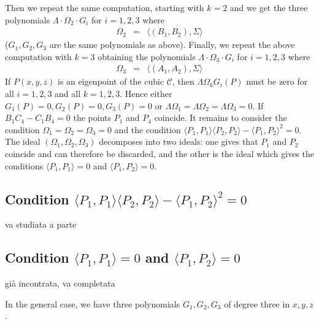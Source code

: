 \documentclass{amsart}
\theoremstyle{plain}
\theoremstyle{definition}
\newcommand{\scl}[2]{\langle #1, #2 \rangle}
\begin{document}
Then we repeat the same computation, starting with $k=2$ and 
we get the three polynomials
$\Lambda \cdot \Omega_2 \cdot G_i$ for $i=1, 2, 3$
where
\begin{eqnarray}
\Omega_2 & = & \scl{(B_1, B_2)}{\Sigma}
\end{eqnarray}
($G_1, G_2, G_3$ are the same polynomials as above).
Finally, we repeat the above computation with $k=3$ obtaining the
polynomials
$\Lambda \cdot \Omega_3 \cdot G_i$ for $i=1, 2, 3$
where
\begin{eqnarray}
\Omega_3 & = & \scl{(A_1, A_2)}{\Sigma}
\end{eqnarray}
If $P(x, y, z)$ is an eigenpoint of the cubic $\mathcal{C}$, then
$\Lambda \Omega_k G_i(P)$ must be zero for all $i=1, 2, 3$ and all $k=1, 2, 3$.
Hence either $G_1(P)=0, G_2(P) = 0, G_3(P) = 0$ or
$\Lambda \Omega_1 = \Lambda \Omega_2 = \Lambda \Omega_3 = 0$. If 
$B_1C_4-C_1B_4 =0$ the points $P_1$ and $P_4$ coincide. It remains to consider
the condition $\Omega_1 = \Omega_2 = \Omega_3 = 0$ and the condition
$ \scl{P_1}{P_1} \scl{P_2}{P_2}-\scl{P_1}{P_2}^2 =0$. The ideal
$(\Omega_1, \Omega_2, \Omega_3)$ decomposes into two ideals: one gives that
$P_1$ and $P_2$ coincide and can therefore be discarded, and the other is
the ideal which gives the conditions $\scl{P_1}{P_1}=0$ and $\scl{P_1}{P_2}=0$.

\subsection{Condition $\scl{P_1}{P_1} \scl{P_2}{P_2}-\scl{P_1}{P_2}^2 = 0$}
va studiata a parte 

\subsection{Condition $\scl{P_1}{P_1} = 0$ and $\scl{P_1}{P_2}=0$}
gi\`a incontrata, va completata

In the general case, we have three polynomials $G_1, G_2, G_3$ of degree
three in $x, y, z$.
\end{document}
